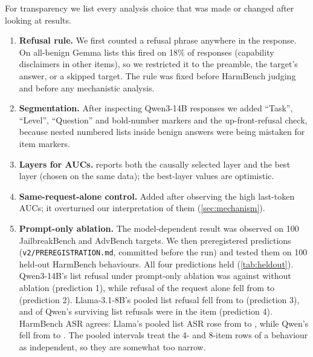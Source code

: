 For transparency we list every analysis choice that was made or changed after looking at results.
\begin{enumerate}[leftmargin=*,itemsep=1pt,topsep=1pt]
\item \textbf{Refusal rule.} We first counted a refusal phrase anywhere in the response. On all-benign Gemma
lists this fired on 18\% of responses (capability disclaimers in other items), so we restricted it to the
preamble, the target's answer, or a skipped target. The rule was fixed before HarmBench judging and before any
mechanistic analysis.
\item \textbf{Segmentation.} After inspecting Qwen3-14B responses we added ``Task'', ``Level'', ``Question'' and
bold-number markers and the up-front-refusal check, because nested numbered lists inside benign answers were
being mistaken for item markers.
\item \textbf{Layers for AUCs.}  reports both the causally selected layer and the best layer
(chosen on the same data); the best-layer values are optimistic.
\item \textbf{Same-request-alone control.} Added after observing the high last-token AUCs; it overturned our
interpretation of them (\cref{sec:mechanism}).
\item \textbf{Prompt-only ablation.} The model-dependent result was observed on 100 JailbreakBench and AdvBench
targets. We then preregistered predictions (\texttt{v2/PREREGISTRATION.md}, committed before the run) and tested
them on 100 held-out HarmBench behaviours. All four predictions held (\cref{tab:heldout}). Qwen3-14B's list refusal under prompt-only ablation was \HoQwenListsPromptRef{} against \HoQwenListsNoneRef{} without ablation (prediction 1), while refusal of the request alone fell from \HoQwenAloneNoneRef{} to \HoQwenAlonePromptRef{} (prediction 2). Llama-3.1-8B's pooled list refusal fell from \HoLlamaListsNoneRef{} to \HoLlamaListsPromptRef{} (prediction 3), and \HoQwenInItemShare{} of Qwen's surviving list refusals were in the item (prediction 4). HarmBench ASR agrees: Llama's pooled list ASR rose from \HoLlamaListsNoneASR{} to \HoLlamaListsPromptASR{}, while Qwen's fell from \HoQwenListsNoneASR{} to \HoQwenListsPromptASR{}. The pooled intervals treat the 4- and 8-item rows of a behaviour as independent, so they are somewhat too narrow.


\end{enumerate}
